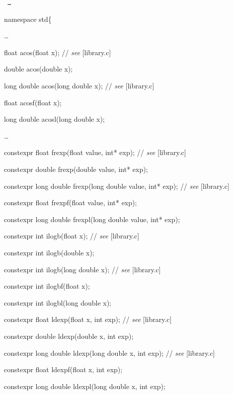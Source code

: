 \documentclass[prd,twocolumn,amsmath,amssymb,nofootinbib,eqsecnum]{revtex4-1}
\newcommand{\code}[1]{{\tt #1}}
\newcommand{\highlight}[1]{{\color{green} #1}}
\newcommand{\stdcomment}[1]{{// {\it see} [#1]}}
\begin{document}
\code{
\ldots
\vspace{2ex}

namespace std\{

\vspace{2ex}
\ldots
\vspace{2ex}

float acos(float x); \stdcomment{library.c}

double acos(double x);

long double acos(long double x); \stdcomment{library.c}

float acosf(float x);

long double acosl(long double x);

\vspace{2ex}
\ldots
\vspace{2ex}

\highlight{constexpr}  float frexp(float value, int* exp); \stdcomment{library.c}

\highlight{constexpr}  double frexp(double value, int* exp);

\highlight{constexpr}  long double frexp(long double value, int* exp); \stdcomment{library.c}

\highlight{constexpr}  float frexpf(float value, int* exp);

\highlight{constexpr}  long double frexpl(long double value, int* exp);

\vspace{2ex}

\highlight{constexpr} int ilogb(float x); \stdcomment{library.c}

\highlight{constexpr} int ilogb(double x);

\highlight{constexpr} int ilogb(long double x); \stdcomment{library.c}

\highlight{constexpr} int ilogbf(float x);

\highlight{constexpr} int ilogbl(long double x);

\vspace{2ex}

\highlight{constexpr} float ldexp(float x, int exp); \stdcomment{library.c}

\highlight{constexpr} double ldexp(double x, int exp);

\highlight{constexpr} long double ldexp(long double x, int exp); \stdcomment{library.c}

\highlight{constexpr} float ldexpf(float x, int exp);

\highlight{constexpr} long double ldexpl(long double x, int exp);

}
\end{document}
